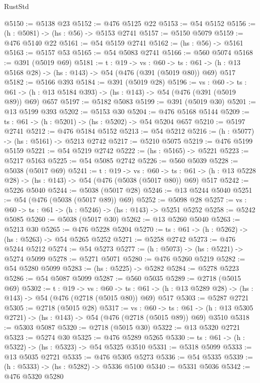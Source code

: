 \begin{lexlean}{RustStd}
\begin{coremodule}
@5150 := @5138 @23
@5152 := @476 @5125 @22
@5153 := @54 @5152
@5156 := (h : @5081) -> (hs : @56) -> @5153 @2741
@5157 := @5150 @5079
@5159 := @476 @5140 @22
@5161 := @54 @5159 @2741
@5162 := (hs : @56) -> @5161
@5163 := @5157 @53
@5165 := @54 @5083 @2741
@5166 := @560 @5074
@5168 := @391 (@5019 @69)
@5181 := {t : @19} ->
  {vs : @60} ->
  {ts : @61} -> (h : @13 @5168 @28) -> (hs : @143) -> @54 (@476 (@391 (@5019 @80)) @69) @517
@5182 := @5166 @393
@5184 := @391 (@5019 @28)
@5196 := {vs : @60} ->
  {ts : @61} -> (h : @13 @5184 @393) -> (hs : @143) -> @54 (@476 (@391 (@5019 @89)) @69) @657
@5197 := @5182 @5083
@5199 := @391 (@5019 @30)
@5201 := @13 @5199 @393
@5202 := @5153 @30
@5204 := @476 @5168 @5144
@5209 := {ts : @61} -> (h : @5201) -> (hs : @5202) -> @54 @5204 @657
@5210 := @5197 @2741
@5212 := @476 @5184 @5152
@5213 := @54 @5212
@5216 := (h : @5077) -> (hs : @5161) -> @5213 @2742
@5217 := @5210 @5075
@5219 := @476 @5199 @5159
@5221 := @54 @5219 @2742
@5222 := (hs : @5165) -> @5221
@5223 := @5217 @5163
@5225 := @54 @5085 @2742
@5226 := @560 @5039
@5228 := @5038 (@5017 @69)
@5241 := {t : @19} ->
  {vs : @60} ->
  {ts : @61} -> (h : @13 @5228 @28) -> (hs : @143) -> @54 (@476 (@5038 (@5017 @80)) @69) @517
@5242 := @5226 @5040
@5244 := @5038 (@5017 @28)
@5246 := @13 @5244 @5040
@5251 := @54 (@476 (@5038 (@5017 @89)) @69)
@5252 := @5098 @28
@5257 := {vs : @60} -> {ts : @61} -> (h : @5246) -> (hs : @143) -> @5251 @5252
@5258 := @5242 @5085
@5260 := @5038 (@5017 @30)
@5262 := @13 @5260 @5040
@5263 := @5213 @30
@5265 := @476 @5228 @5204
@5270 := {ts : @61} -> (h : @5262) -> (hs : @5263) -> @54 @5265 @5252
@5271 := @5258 @2742
@5273 := @476 @5244 @5212
@5274 := @54 @5273
@5277 := (h : @5073) -> (hs : @5221) -> @5274 @5099
@5278 := @5271 @5071
@5280 := @476 @5260 @5219
@5282 := @54 @5280 @5099
@5283 := (hs : @5225) -> @5282
@5284 := @5278 @5223
@5286 := @54 @5087 @5099
@5287 := @560 @5035
@5289 := @2718 (@5015 @69)
@5302 := {t : @19} ->
  {vs : @60} ->
  {ts : @61} -> (h : @13 @5289 @28) -> (hs : @143) -> @54 (@476 (@2718 (@5015 @80)) @69) @517
@5303 := @5287 @2721
@5305 := @2718 (@5015 @28)
@5317 := {vs : @60} ->
  {ts : @61} -> (h : @13 @5305 @2721) -> (hs : @143) -> @54 (@476 (@2718 (@5015 @89)) @69) @3510
@5318 := @5303 @5087
@5320 := @2718 (@5015 @30)
@5322 := @13 @5320 @2721
@5323 := @5274 @30
@5325 := @476 @5289 @5265
@5330 := {ts : @61} -> (h : @5322) -> (hs : @5323) -> @54 @5325 @3510
@5331 := @5318 @5099
@5333 := @13 @5035 @2721
@5335 := @476 @5305 @5273
@5336 := @54 @5335
@5339 := (h : @5333) -> (hs : @5282) -> @5336 @5100
@5340 := @5331 @5036
@5342 := @476 @5320 @5280

\end{coremodule}
\end{lexlean}
